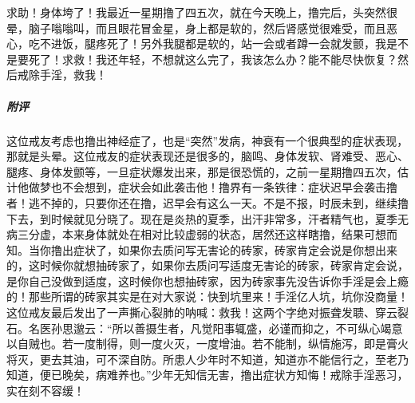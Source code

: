\begin{case}
    求助！身体垮了！我最近一星期撸了四五次，就在今天晚上，撸完后，头突然很晕，脑子嗡嗡叫，而且眼花冒金星，身上都是软的，然后肾感觉很难受，而且恶心，吃不进饭，腿疼死了！另外我腿都是软的，站一会或者蹲一会就发颤，我是不是要死了！求救！我还年轻，不想就这么完了，我该怎么办？能不能尽快恢复？然后戒除手淫，救我！
    \subparagraph{附评} 这位戒友考虑也撸出神经症了，也是“突然”发病，神衰有一个很典型的症状表现，那就是头晕。这位戒友的症状表现还是很多的，脑鸣、身体发软、肾难受、恶心、腿疼、身体发颤等，一旦症状爆发出来，那是很恐慌的，之前一星期撸四五次，估计他做梦也不会想到，症状会如此袭击他！撸界有一条铁律：症状迟早会袭击撸者！逃不掉的，只要你还在撸，迟早会有这么一天。不是不报，时辰未到，继续撸下去，到时候就见分晓了。现在是炎热的夏季，出汗非常多，汗者精气也，夏季无病三分虚，本来身体就处在相对比较虚弱的状态，居然还这样瞎撸，结果可想而知。当你撸出症状了，如果你去质问写无害论的砖家，砖家肯定会说是你想出来的，这时候你就想抽砖家了，如果你去质问写适度无害论的砖家，砖家肯定会说，是你自己没做到适度，这时候你也想抽砖家，因为砖家事先没告诉你手淫是会上瘾的！那些所谓的砖家其实是在对大家说：快到坑里来！手淫亿人坑，坑你没商量！这位戒友最后发出了一声撕心裂肺的呐喊：救我！这两个字绝对振聋发聩、穿云裂石。名医孙思邈云：“所以善摄生者，凡觉阳事辄盛，必谨而抑之，不可纵心竭意以自贼也。若一度制得，则一度火灭，一度增油。若不能制，纵情施泻，即是膏火将灭，更去其油，可不深自防。所患人少年时不知道，知道亦不能信行之，至老乃知道，便已晚矣，病难养也。”少年无知信无害，撸出症状方知悔！戒除手淫恶习，实在刻不容缓！
\end{case}

